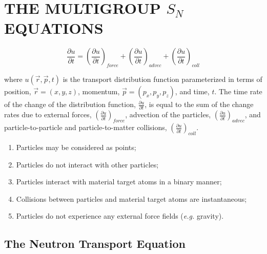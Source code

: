 %
%
%
\chapter{\uppercase {The Multigroup $S_N$ Equations}}



\begin{equation}
\label{eq::gen_boltzmann}
\frac{\partial u}{\partial t} = \left( \frac{\partial u}{\partial t}  \right)_{force} + \left( \frac{\partial u}{\partial t}  \right)_{advec} + \left( \frac{\partial u}{\partial t}  \right)_{coll}
\end{equation}

\noindent where $u(\vec{r},\vec{p},t)$ is the transport distribution function parameterized in terms of position, $\vec{r}=(x,y,z)$, momentum, $\vec{p}=(p_x,p_y,p_z)$, and time, $t$. The time rate of the change of the distribution function, $\frac{\partial u}{\partial t}$, is equal to the sum of the change rates due to external forces, $\left( \frac{\partial u}{\partial t}  \right)_{force} $, advection of the particles, $\left( \frac{\partial u}{\partial t}  \right)_{advec}$, and particle-to-particle and particle-to-matter collisions, $\left( \frac{\partial u}{\partial t}  \right)_{coll}$.

\begin{enumerate}
	\item Particles may be considered as points;
	\item Particles do not interact with other particles;
	\item Particles interact with material target atoms in a binary manner;
	\item Collisions between particles and material target atoms are instantaneous;
	\item Particles do not experience any external force fields ({\em e.g.} gravity).
\end{enumerate}

\section{The Neutron Transport Equation}
\label{sec::Sn_neut}

